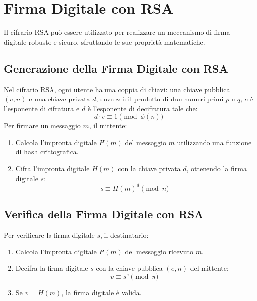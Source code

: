 \documentclass[a4paper,12pt]{report}
\begin{document}
\section{Firma Digitale con RSA}
Il cifrario RSA può essere utilizzato per realizzare un meccanismo di firma digitale robusto e sicuro, sfruttando le sue proprietà matematiche.

\subsection*{Generazione della Firma Digitale con RSA}
Nel cifrario RSA, ogni utente ha una coppia di chiavi: una chiave pubblica $(e, n)$ e una chiave privata $d$, dove $n$ è il prodotto di due numeri primi $p$ e $q$, $e$ è l'esponente di cifratura e $d$ è l'esponente di decifratura tale che:
\[d \cdot e \equiv 1 \pmod{\phi(n)}\]
Per firmare un messaggio $m$, il mittente:

\begin{enumerate}
    \item Calcola l'impronta digitale $H(m)$ del messaggio $m$ utilizzando una funzione di hash crittografica.
    \item Cifra l'impronta digitale $H(m)$ con la chiave privata $d$, ottenendo la firma digitale $s$:
    \[ s \equiv H(m)^d \pmod{n}\]
\end{enumerate}

\subsection*{Verifica della Firma Digitale con RSA}
Per verificare la firma digitale $s$, il destinatario:

\begin{enumerate}
    \item Calcola l'impronta digitale $H(m)$ del messaggio ricevuto $m$.
    \item Decifra la firma digitale $s$ con la chiave pubblica $(e, n)$ del mittente:
    \[v \equiv s^e \pmod{n}\]
    \item Se $v = H(m)$, la firma digitale è valida.
\end{enumerate}
\end{document}
